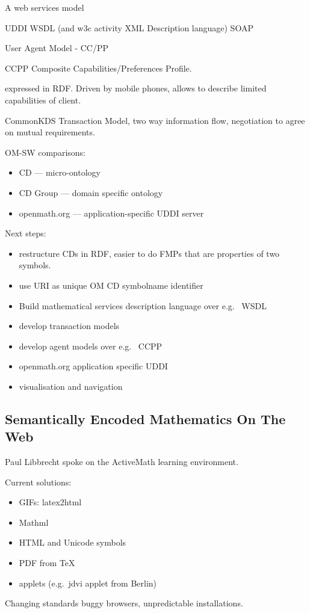 \documentclass[11pt, a4paper]{article}
\begin{document}
A web services model

UDDI WSDL (and w3c activity XML Description language) SOAP

User Agent Model - CC/PP

CCPP Composite Capabilities/Preferences Profile.

expressed in RDF.
Driven by mobile phones, allows to describe limited capabilities of
client.

CommonKDS Transaction Model,
two way information flow, negotiation to agree on mutual requirements.

OM-SW comparisons:
\begin{itemize}
\item CD --- micro-ontology
\item CD Group --- domain specific ontology
\item openmath.org --- application-specific UDDI server
\end{itemize}


Next steps:
\begin{itemize}
\item restructure CDs in RDF, easier to do FMPs that are properties of
  two symbols.
\item use URI as unique OM CD symbolname identifier
\item Build mathematical services description language over e.g.~ WSDL
\item develop transaction models
\item develop agent models over e.g.~  CCPP
\item openmath.org application specific UDDI
\item visualisation and navigation
\end{itemize}

\subsection{Semantically Encoded Mathematics On The Web}
Paul Libbrecht spoke on the ActiveMath learning environment.

Current solutions:
\begin{itemize}
\item GIFs: latex2html
\item Mathml
\item HTML and Unicode symbols
\item PDF from \TeX
\item applets (e.g.~jdvi applet from Berlin)
\end{itemize}
Changing standards buggy browsers, unpredictable installations.
\end{document}
